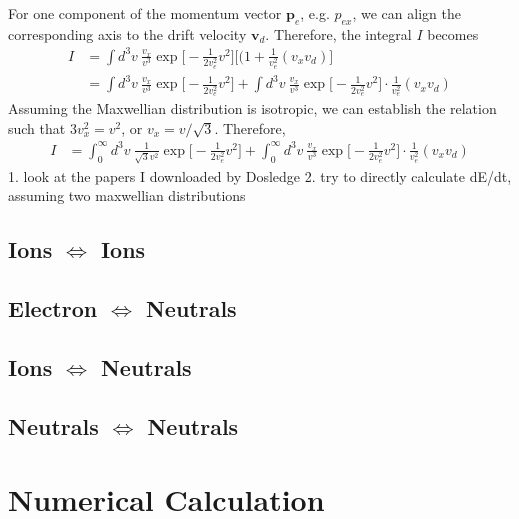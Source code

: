 \documentclass{article}
\begin{document}
For one component of the momentum vector $\bm{p}_e$, e.g. $p_{ex}$, we can align the corresponding axis to the drift velocity $\bm{v}_d$. Therefore, the integral $I$ becomes
\begin{equation}
	\begin{split}
		I &= \int d^3v\ \frac{v_x}{v^3} \exp\Big[-\frac{1}{2v_e^2}v^2 \Big] \Big[(1 + \frac{1}{v_e^2}(v_x v_d ) \Big] \\
		&= \int d^3v\ \frac{v_x}{v^3} \exp\Big[-\frac{1}{2v_e^2}v^2 \Big] + \int d^3v\ \frac{v_x}{v^3} \exp\Big[-\frac{1}{2v_e^2}v^2 \Big] \cdot \frac{1}{v_e^2}(v_x v_d )
	\end{split}
\end{equation}
Assuming the Maxwellian distribution is isotropic, we can establish the relation such that $3v_x^2 = v^2$, or $v_x = v/ \sqrt{3}$. Therefore,
\begin{equation}
	\begin{split}
		I &= \int_0^\infty d^3v\ \frac{1}{\sqrt{3} v^2} \exp\Big[-\frac{1}{2v_e^2}v^2 \Big] + \int_0^\infty d^3v\ \frac{v_x}{v^3} \exp\Big[-\frac{1}{2v_e^2}v^2 \Big] \cdot \frac{1}{v_e^2}(v_x v_d )
	\end{split}
\end{equation}
1. look at the papers I downloaded by Dosledge 2. try to directly calculate dE/dt, assuming two maxwellian distributions


\subsection{Ions $\Longleftrightarrow$ Ions}

\subsection{Electron $\Longleftrightarrow$ Neutrals}

\subsection{Ions $\Longleftrightarrow$ Neutrals}

\subsection{Neutrals $\Longleftrightarrow$ Neutrals}

\section{Numerical Calculation}
\end{document}
